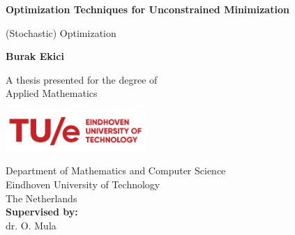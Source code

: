 \begin{titlepage}
    \begin{center}
        \vspace*{1cm}

        \Huge
        \textbf{Optimization Techniques for Unconstrained Minimization}
        

        \vspace{0.5cm}
        \LARGE
        (Stochastic) Optimization

        \vspace{1.5cm}

        \textbf{Burak Ekici}

        \vfill

        A thesis presented for the degree of\\
        Applied Mathematics
        \vspace{0.5cm}
        
        

        

        \vspace{0.8cm}
        

        \includegraphics[width=0.4\textwidth]{logobetter.png}

        \Large
        Department of Mathematics and Computer Science\\
        Eindhoven University of Technology\\
        The Netherlands\\
        \vspace*{1cm}
        \large
        \textbf{Supervised by:}
        \\[0.1cm]
        dr. O. Mula

    \end{center}
\end{titlepage}